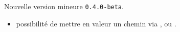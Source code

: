 Nouvelle version mineure \verb+0.4.0-beta+.

\begin{itemize}[itemsep=.5em]
    \item {}
    	  possibilité de mettre en valeur un chemin via ,   ou .
\end{itemize}

\separation
